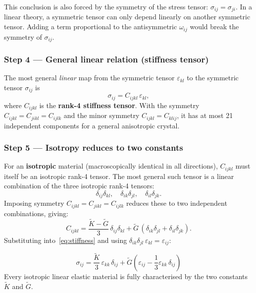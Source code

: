 \begin{remark}
    This conclusion is also forced by the symmetry of the stress tensor: $\sigma_{ij}=\sigma_{ji}$. In a linear theory, a symmetric tensor can only depend linearly on another symmetric tensor. Adding a term proportional to the antisymmetric $\omega_{ij}$ would break the symmetry of $\sigma_{ij}$.
\end{remark}

\subsubsection*{Step 4 — General linear relation (stiffness tensor)}

The most general \emph{linear} map from the symmetric tensor $\varepsilon_{kl}$ to the symmetric tensor $\sigma_{ij}$ is
\begin{equation}
    \sigma_{ij} = C_{ijkl}\,\varepsilon_{kl},
    \label{eq:stiffness}
\end{equation}
where $C_{ijkl}$ is the \textbf{rank-4 stiffness tensor}. With the symmetry $C_{ijkl}=C_{jikl}=C_{ijlk}$ and the minor symmetry $C_{ijkl}=C_{klij}$, it has at most 21 independent components for a general anisotropic crystal.

\subsubsection*{Step 5 — Isotropy reduces to two constants}

For an \textbf{isotropic} material (macroscopically identical in all directions), $C_{ijkl}$ must itself be an isotropic rank-4 tensor. The most general such tensor is a linear combination of the three isotropic rank-4 tensors:
\[
    \delta_{ij}\delta_{kl},\quad \delta_{ik}\delta_{jl},\quad \delta_{il}\delta_{jk}.
\]
Imposing symmetry $C_{ijkl}=C_{jikl}=C_{ijlk}$ reduces these to two independent combinations, giving:
\[
    C_{ijkl} = \frac{\tilde{K}-\tilde{G}}{3}\,\delta_{ij}\delta_{kl} + \tilde{G}\,(\delta_{ik}\delta_{jl}+\delta_{il}\delta_{jk}).
\]
Substituting into~\eqref{eq:stiffness} and using $\delta_{ik}\delta_{jl}\,\varepsilon_{kl}=\varepsilon_{ij}$:

\begin{equation}
    \boxed{\sigma_{ij} = \frac{\tilde{K}}{3}\,\varepsilon_{kk}\,\delta_{ij} + \tilde{G}\!\left(\varepsilon_{ij} - \frac{1}{3}\varepsilon_{kk}\,\delta_{ij}\right)}
    \label{eq:hooke_tilde}
\end{equation}
Every isotropic linear elastic material is fully characterised by the two constants $\tilde{K}$ and $\tilde{G}$.

